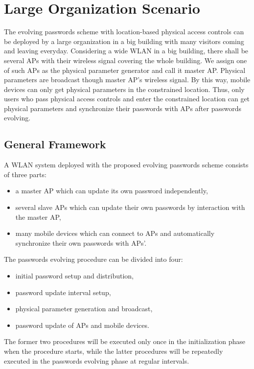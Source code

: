 \section{Large Organization Scenario}
\label{sec:large}

The evolving passwords scheme with location-based physical access controls can be deployed by a large organization in a big building with many visitors coming and leaving everyday. Considering a wide WLAN in a big building, there shall be several APs with their wireless signal covering the whole building. We assign one of such APs as the physical parameter generator and call it master AP. Physical parameters are broadcast though master AP’s wireless signal. By this way, mobile devices can only get physical parameters in the constrained location. Thus, only users who pass physical access controls and enter the constrained location can get physical parameters and synchronize their passwords with APs after passwords evolving. 	

\subsection{General Framework}
A WLAN system deployed with the proposed evolving passwords scheme consists of three parts: 
\begin{itemize}
    \item a master AP which can update its own password independently,
    \item several slave APs which can update their own passwords by interaction with the master AP, 
    \item many mobile devices which can connect to APs and automatically synchronize their own passwords with APs’.
\end{itemize}

The passwords evolving procedure can be divided into four: 
\begin{itemize}
    \item initial password setup and distribution,
    \item password update interval setup, 
    \item physical parameter generation and broadcast,
    \item password update of APs and mobile devices. 
\end{itemize}

The former two procedures will be executed only once in the initialization phase when the procedure starts, while the latter procedures will be repeatedly executed in the passwords evolving phase at regular intervals. 


